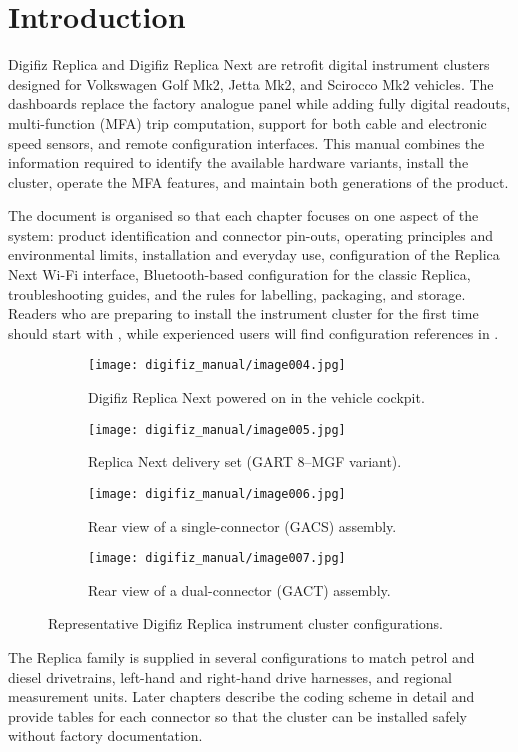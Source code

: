 \chapter{Introduction} \label{ch:introduction}

Digifiz Replica and Digifiz Replica Next are retrofit digital instrument clusters designed for Volkswagen Golf Mk2, Jetta Mk2, and Scirocco Mk2 vehicles.
The dashboards replace the factory analogue panel while adding fully digital readouts, multi-function (MFA) trip computation, support for both cable and electronic speed sensors, and remote configuration interfaces.
This manual combines the information required to identify the available hardware variants, install the cluster, operate the MFA features, and maintain both generations of the product.

The document is organised so that each chapter focuses on one aspect of the system: product identification and connector pin-outs, operating principles and environmental limits, installation and everyday use, configuration of the Replica Next Wi-Fi interface, Bluetooth-based configuration for the classic Replica, troubleshooting guides, and the rules for labelling, packaging, and storage.
Readers who are preparing to install the instrument cluster for the first time should start with , while experienced users will find configuration references in .

\begin{figure}[htbp]
    \centering
    \begin{subfigure}{0.48\textwidth}
        \texttt{[image: digifiz\_manual/image004.jpg]}
        \caption{Digifiz Replica Next powered on in the vehicle cockpit.}
    \end{subfigure}\hfill
    \begin{subfigure}{0.48\textwidth}
        \texttt{[image: digifiz\_manual/image005.jpg]}
        \caption{Replica Next delivery set (GART 8--MGF variant).}
    \end{subfigure}
    \begin{subfigure}{0.48\textwidth}
        \texttt{[image: digifiz\_manual/image006.jpg]}
        \caption{Rear view of a single-connector (GACS) assembly.}
    \end{subfigure}\hfill
    \begin{subfigure}{0.48\textwidth}
        \texttt{[image: digifiz\_manual/image007.jpg]}
        \caption{Rear view of a dual-connector (GACT) assembly.}
    \end{subfigure}
    \caption{Representative Digifiz Replica instrument cluster configurations.}
    \label{fig:intro-product-views}
\end{figure}

The Replica family is supplied in several configurations to match petrol and diesel drivetrains, left-hand and right-hand drive harnesses, and regional measurement units.
Later chapters describe the coding scheme in detail and provide tables for each connector so that the cluster can be installed safely without factory documentation.
